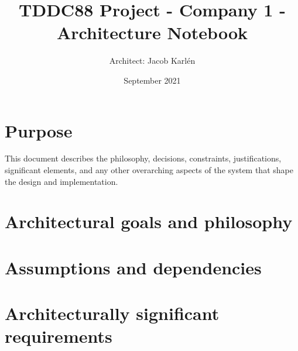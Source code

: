 \documentclass{article}
\title{TDDC88 Project - Company 1 - Architecture Notebook}
\author{Architect: Jacob Karlén}
\date{September 2021}
\begin{document}
\newcommand{\comment}[1]{} %

\maketitle

\section{Purpose}
\comment{
Always address Sections 2 through 6 of this template. Other sections are recommended, depending on the amount of novel architecture, the amount of expected maintenance, the skills of the development team, and the importance of other architectural concerns.
}


This document describes the philosophy, decisions, constraints, justifications, significant elements, and any other overarching aspects of the system that shape the design and implementation. 

\section{Architectural goals and philosophy}
\comment{
Describe the philosophy of the architecture. Identify issues that will drive the philosophy, such as: Will the system be driven by complex deployment concerns, adapting to legacy systems, or performance issues? Does it need to be robust for long-term maintenance? 

Formulate a set of goals that the architecture needs to meet in its structure and behavior. Identify critical issues that must be addressed by the architecture, such as: Are there hardware dependencies that should be isolated from the rest of the system? Does the system need to function efficiently under unusual conditions?
}


\section{Assumptions and dependencies}
\comment{
[List the assumptions and dependencies that drive architectural decisions. This could include sensitive or critical areas, dependencies on legacy interfaces, the skill and experience of the team, the availability of important resources, and so forth]
}

\section{Architecturally significant requirements}
\comment{
Insert a reference or link to the requirements that must be implemented to realize the architecture.
}
\end{document}
